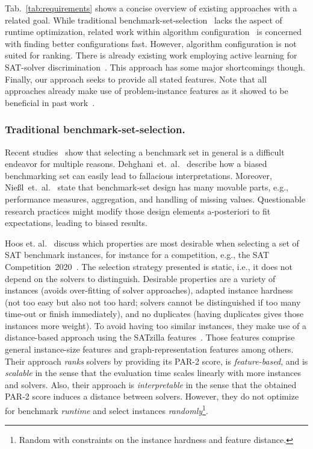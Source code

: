 \documentclass[runningheads]{llncs}
\begin{document}
Tab.~\ref{tab:requirements} shows a concise overview of existing approaches with a related goal.
While traditional benchmark-set-selection~\cite{HoosKSS13} lacks the aspect of runtime optimization, related work within algorithm configuration~\cite{HutterHL11} is concerned with finding better configurations fast.
However, algorithm configuration is not suited for ranking.
There is already existing work employing active learning for SAT-solver discrimination~\cite{MatriconAFSH21}.
This approach has some major shortcomings though.
Finally, our approach seeks to provide all stated features.
Note that all approaches already make use of problem-instance features as it showed to be beneficial in past work~\cite{HoosKSS13,CollauttiMMO13,NgokoCT19}.

\subsubsection{Traditional benchmark-set-selection.}
Recent studies~\cite{abs-2107-07002,NiesslHWCB22} show that selecting a benchmark set in general is a difficult endeavor for multiple reasons.
Dehghani~et.~al.~\cite{abs-2107-07002} describe how a biased benchmarking set can easily lead to fallacious interpretations.
Moreover, Nießl~et.~al.~\cite{NiesslHWCB22} state that benchmark-set design has many movable parts, e.g., performance measures, aggregation, and handling of missing values.
Questionable research practices might modify those design elements a-posteriori to fit expectations, leading to biased results.

Hoos et. al.~\cite{HoosKSS13} discuss which properties are most desirable when selecting a set of SAT benchmark instances, for instance for a competition, e.g., the SAT Competition~2020~\cite{FroleyksHIJS21}.
The selection strategy presented is static, i.e., it does not depend on the solvers to distinguish.
Desirable properties are a variety of instances (avoids over-fitting of solver approaches), adapted instance hardness (not too easy but also not too hard; solvers cannot be distinguished if too many time-out or finish immediately), and no duplicates (having duplicates gives those instances more weight).
To avoid having too similar instances, they make use of a distance-based approach using the SATzilla features~\cite{XuHHL08,features}.
Those features comprise general instance-size features and graph-representation features among others.
Their approach \textit{ranks} solvers by providing its PAR-2 score, is \textit{feature-based}, and is \textit{scalable} in the sense that the evaluation time scales linearly with more instances and solvers.
Also, their approach is \textit{interpretable} in the sense that the obtained PAR-2 score induces a distance between solvers.
However, they do not optimize for benchmark \textit{runtime} and select instances \textit{randomly}\footnote{Random with constraints on the instance hardness and feature distance.}.
\end{document}
